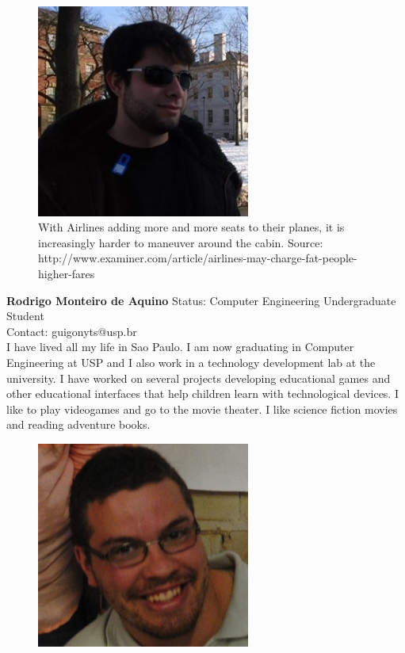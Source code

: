 \documentclass[a4paper, 12pt,conference]{new_cit_thesis}
\begin{document}
\begin{figure}[h]
  \centering
     \includegraphics[width=7cm]{images/image014}
   \caption{With Airlines adding more and more seats to their planes, it is increasingly harder to maneuver around the cabin.
                  Source: http://www.examiner.com/article/airlines-may-charge-fat-people-higher-fares}
  \label{fig:14}
\end{figure}

\textbf{Rodrigo Monteiro de Aquino}
Status: Computer Engineering Undergraduate Student \\
Contact: guigonyts@usp.br \\
I have lived all my life in Sao Paulo. I am now graduating in Computer Engineering at USP and I also work in a technology development lab at the university. I have worked on several projects developing educational games and other educational interfaces that help children learn with technological devices.  I like to play videogames and go to the movie theater. I like science fiction movies and reading adventure books.

\begin{figure}[h]
  \centering
     \includegraphics[width=7cm]{images/image015}
  \label{fig:15}
\end{figure}
\end{document}
